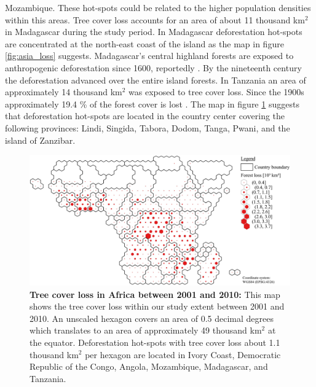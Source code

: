Mozambique. These hot-spots could be related to the higher population densities within this areas. Tree cover loss accounts for an area of about 11 thousand km$^2$ in Madagascar during the study period. In Madagascar deforestation hot-spots are concentrated at the north-east coast of the island as the map in figure \ref{fig:asia_loss} suggests. Madagascar's central highland forests are exposed to anthropogenic deforestation since 1600, reportedly \citep{Harper2007}. By the nineteenth century the deforestation advanced over the entire island forests. In Tanzania an area of approximately 14 thousand km$^2$ was exposed to tree cover loss. Since the 1900s approximately 19.4 \% of the forest cover is lost \citep{Kideghesho2015}. The map in figure \ref{fig:africa_loss} suggests that deforestation hot-spots are located in the country center covering the following provinces: Lindi, Singida, Tabora, Dodom, Tanga, Pwani, and the island of Zanzibar.
			\begin{figure}[ht]
				\centering
				\includegraphics[scale=.9]{img/africa_loss_frameless}
				\caption[Tree cover loss in Africa between 2001 and 2010]{\textbf{Tree cover loss in Africa between 2001 and 2010:} This map shows the tree cover loss within our study extent between 2001 and 2010. An unscaled hexagon covers an area of 0.5 decimal degrees which translates to an area of approximately 49 thousand km$^2$ at the equator. Deforestation hot-spots with tree cover loss about 1.1 thousand km$^2$ per hexagon are located in Ivory Coast, Democratic Republic of the Congo, Angola, Mozambique, Madagascar, and Tanzania.}
				\label{fig:africa_loss}
			\end{figure}

